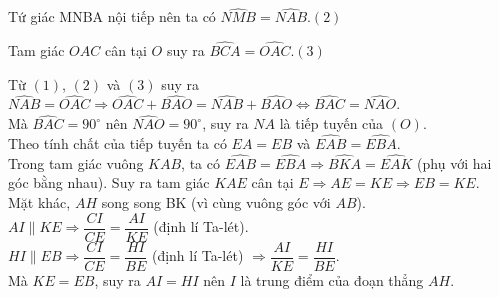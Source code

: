 \begin{ex}
{\begin{listEX}
			Tứ giác MNBA nội tiếp nên ta có $\widehat{NMB}=\widehat{NAB}$.\hfill$(2)$
			
			Tam giác $OAC$ cân tại $O$ suy ra $\widehat{BCA}=\widehat{OAC}$.\hfill$(3)$
			
			Từ $(1)$, $(2)$ và $(3)$ suy ra $\widehat{NAB}=\widehat{OAC}\Rightarrow \widehat{OAC}+\widehat{BAO}=\widehat{NAB}+\widehat{BAO}\Leftrightarrow \widehat{BAC}=\widehat{NAO}$.\\
			Mà $\widehat{BAC}=90^{\circ}$ nên $\widehat{NAO}=90^{\circ}$, suy ra $NA$ là tiếp tuyến của $(O)$.\\
			Theo tính chất của tiếp tuyến ta có $EA=EB$ và $\widehat{EAB}=\widehat{EBA}$.\\
			Trong tam giác vuông $KAB$, ta có $\widehat{EAB}=\widehat{EBA}\Rightarrow \widehat{BKA}=\widehat{EAK}$ (phụ với hai góc bằng nhau). Suy ra tam giác $KAE$ cân tại $E \Rightarrow AE=KE\Rightarrow EB=KE$.\\
			Mặt khác, $AH$ song song BK (vì cùng vuông góc với $AB$).\\
			$AI\parallel KE\Rightarrow \dfrac{CI}{CE}=\dfrac{AI}{KE}$ (định lí Ta-lét).\\
			$HI\parallel EB \Rightarrow \dfrac{CI}{CE}=\dfrac{HI}{BE}$ (định lí Ta-lét) $\Rightarrow \dfrac{AI}{KE}=\dfrac{HI}{BE}$.\\
			Mà $KE=EB$, suy ra $AI=HI$ nên $I$ là trung điểm của đoạn thẳng $AH$.		
		\end{listEX}
	}
\end{ex}

